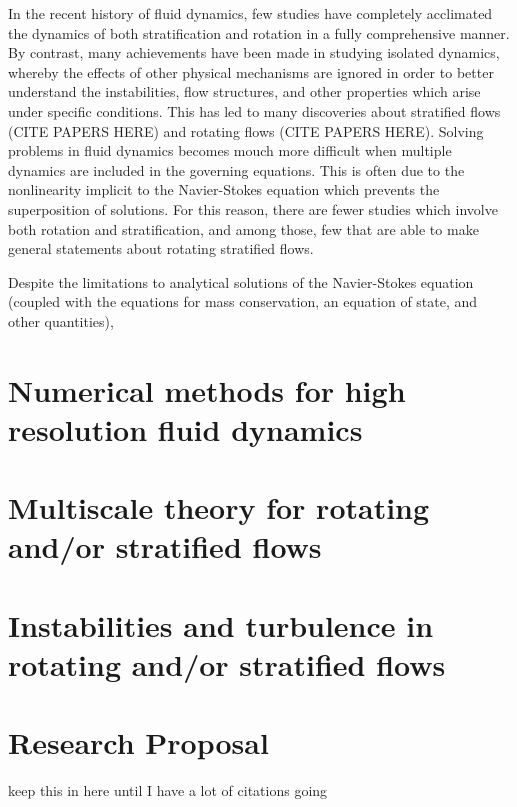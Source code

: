 \documentclass[lineno]{jfm}
\begin{document}
In the recent history of fluid dynamics, few studies have completely acclimated
the dynamics of both stratification and rotation in a fully comprehensive
manner. By contrast, many achievements have been made in studying isolated
dynamics, whereby the effects of other physical mechanisms are ignored in order to
better understand the instabilities, flow structures, and other properties which arise
under specific conditions. This has led to many discoveries about stratified flows ({\red CITE PAPERS HERE}) and rotating
flows ({\red CITE PAPERS HERE}). Solving problems in fluid dynamics becomes
mouch more difficult when multiple dynamics are included in the governing
equations. This is often due to the nonlinearity implicit to the Navier-Stokes
equation which prevents the superposition of solutions. For this reason, there
are fewer studies which involve both rotation and stratification, and among
those, few that are able to make general statements about rotating stratified
flows.

Despite the limitations to analytical solutions of the Navier-Stokes equation
(coupled with the equations for mass conservation, an equation of state, and
other quantities), 


\section{Numerical methods for high resolution fluid dynamics}
\label{sec:nummethods}
\section{Multiscale theory for rotating and/or stratified flows}
\label{sec:multiscale}

\section{Instabilities and turbulence in rotating and/or stratified
flows}
\label{sec:instabilitesturbulence}

\section{Research Proposal}
\label{sec:researchproposal}
keep this in here until I have a lot of citations going \cite{Chinial2022}



\end{document}

